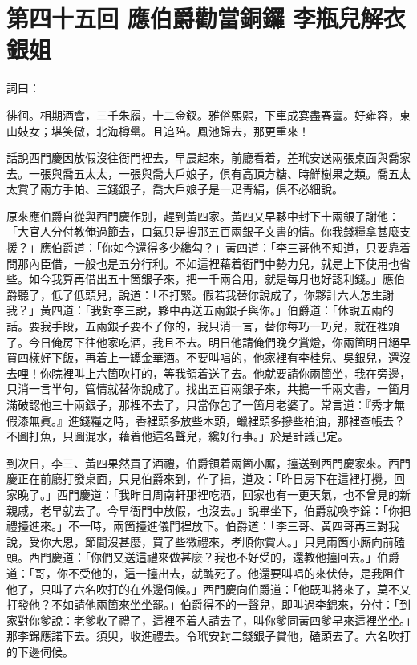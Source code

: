 
\chapter*{第四十五回 應伯爵勸當銅鑼 李瓶兒解衣銀姐}


詞曰：

\begin{myquote}
徘徊。相期酒會，三千朱履，十二金釵。雅俗熙熙，下車成宴盡春臺。好雍容，東山妓女；堪笑傲，北海樽罍。且追陪。鳳池歸去，那更重來！

\end{myquote}

話說西門慶因放假沒往衙門裡去，早晨起來，前廳看着，差玳安送兩張桌面與喬家去。一張與喬五太太，一張與喬大戶娘子，俱有高頂方糖、時鮮樹果之類。喬五太太賞了兩方手帕、三錢銀子，喬大戶娘子是一疋青絹，俱不必細說。

原來應伯爵自從與西門慶作別，趕到黃四家。黃四又早夥中封下十兩銀子謝他：「大官人分付教俺過節去，口氣只是搗那五百兩銀子文書的情。你我錢糧拿甚麼支援？」應伯爵道：「你如今還得多少纔勾？」黃四道：「李三哥他不知道，只要靠着問那內臣借，一般也是五分行利。不如這裡藉着衙門中勢力兒，就是上下使用也省些。如今我算再借出五十箇銀子來，把一千兩合用，就是每月也好認利錢。」應伯爵聽了，低了低頭兒，說道：「不打緊。假若我替你說成了，你夥計六人怎生謝我？」黃四道：「我對李三說，夥中再送五兩銀子與你。」伯爵道：「休說五兩的話。要我手段，五兩銀子要不了你的，我只消一言，替你每巧一巧兒，就在裡頭了。今日俺房下往他家吃酒，我且不去。明日他請俺們晚夕賞燈，你兩箇明日絕早買四樣好下飯，再着上一罈金華酒。不要叫唱的，他家裡有李桂兒、吳銀兒，還沒去哩！你院裡叫上六箇吹打的，等我領着送了去。他就要請你兩箇坐，我在旁邊，只消一言半句，管情就替你說成了。找出五百兩銀子來，共搗一千兩文書，一箇月滿破認他三十兩銀子，那裡不去了，只當你包了一箇月老婆了。常言道：『秀才無假漆無眞。』{}進錢糧之時，香裡頭多放些木頭，蠟裡頭多摻些柏油，那裡查帳去？不圖打魚，只圖混水，藉着他這名聲兒，纔好行事。」於是計議己定。

到次日，李三、黃四果然買了酒禮，伯爵領着兩箇小厮，擡送到西門慶家來。西門慶正在前廳打發桌面，只見伯爵來到，作了揖，道及：「昨日房下在這裡打攪，回家晚了。」西門慶道：「我昨日周南軒那裡吃酒，回家也有一更天氣，也不曾見的新親戚，老早就去了。今早衙門中放假，也沒去。」說畢坐下，伯爵就喚李錦：「你把禮擡進來。」不一時，兩箇擡進儀門裡放下。伯爵道：「李三哥、黃四哥再三對我說，受你大恩，節間沒甚麼，買了些微禮來，孝順你賞人。」只見兩箇小厮向前磕頭。西門慶道：「你們又送這禮來做甚麼？我也不好受的，還教他擡回去。」伯爵道：「哥，你不受他的，這一擡出去，就醜死了。他還要叫唱的來伏侍，是我阻住他了，只叫了六名吹打的在外邊伺候。」西門慶向伯爵道：「他既叫將來了，莫不又打發他？不如請他兩箇來坐坐罷。」伯爵得不的一聲兒，即叫過李錦來，分付：「到家對你爹說：老爹收了禮了，這裡不着人請去了，叫你爹同黃四爹早來這裡坐坐。」那李錦應諾下去。須臾，收進禮去。令玳安封二錢銀子賞他，磕頭去了。六名吹打的下邊伺候。

